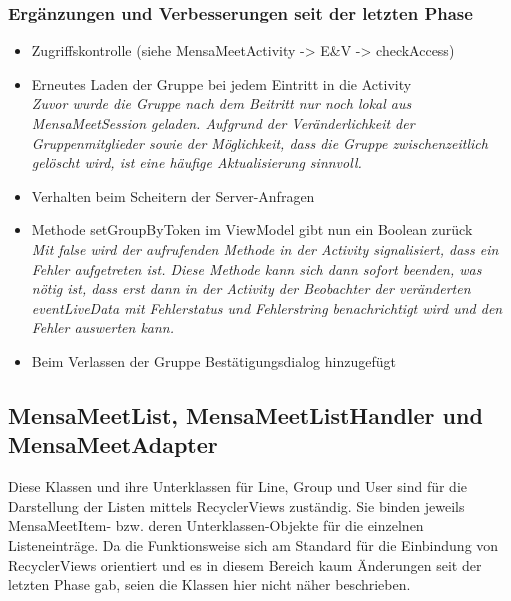 \documentclass[a4paper]{scrreprt}
\begin{document}
\begin{itemize}
\end{itemize}

\subsubsection{Ergänzungen und Verbesserungen seit der letzten Phase}
\begin{itemize}
\item Zugriffskontrolle (siehe MensaMeetActivity -> E\&V -> checkAccess)
\item Erneutes Laden der Gruppe bei jedem Eintritt in die Activity \\
\textit{Zuvor wurde die Gruppe nach dem Beitritt nur noch lokal aus MensaMeetSession geladen. Aufgrund der Veränderlichkeit der Gruppenmitglieder sowie der Möglichkeit, dass die Gruppe zwischenzeitlich gelöscht wird, ist eine häufige Aktualisierung sinnvoll.}
\item Verhalten beim Scheitern der Server-Anfragen
\item Methode setGroupByToken im ViewModel gibt nun ein Boolean zurück\\
\textit{Mit false wird der aufrufenden Methode in der Activity signalisiert, dass ein Fehler aufgetreten ist. Diese Methode kann sich dann sofort beenden, was nötig ist, dass erst dann in der Activity der Beobachter der veränderten eventLiveData mit Fehlerstatus und Fehlerstring benachrichtigt wird und den Fehler auswerten kann.}
\item Beim Verlassen der Gruppe Bestätigungsdialog hinzugefügt

\end{itemize}

\subsection{MensaMeetList, MensaMeetListHandler und MensaMeetAdapter}
Diese Klassen und ihre Unterklassen für Line, Group und User sind für die Darstellung der Listen mittels RecyclerViews zuständig. Sie binden jeweils MensaMeetItem- bzw. deren Unterklassen-Objekte für die einzelnen Listeneinträge. Da die Funktionsweise sich am Standard für die Einbindung von RecyclerViews orientiert und es in diesem Bereich kaum Änderungen seit der letzten Phase gab, seien die Klassen hier nicht näher beschrieben. 
\end{document}
